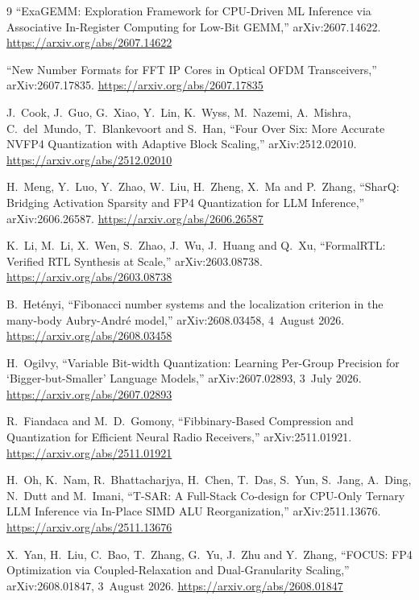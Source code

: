 \documentclass[11pt]{article}
\theoremstyle{definition}
\begin{document}
\begin{thebibliography}{9}
 ``ExaGEMM: Exploration Framework for CPU-Driven ML Inference via Associative In-Register Computing for Low-Bit GEMM,'' arXiv:2607.14622. \url{https://arxiv.org/abs/2607.14622}

 ``New Number Formats for FFT IP Cores in Optical OFDM Transceivers,'' arXiv:2607.17835. \url{https://arxiv.org/abs/2607.17835}

 J.~Cook, J.~Guo, G.~Xiao, Y.~Lin, K.~Wyss, M.~Nazemi, A.~Mishra, C.~del~Mundo, T.~Blankevoort and S.~Han, ``Four Over Six: More Accurate NVFP4 Quantization with Adaptive Block Scaling,'' arXiv:2512.02010. \url{https://arxiv.org/abs/2512.02010}

 H.~Meng, Y.~Luo, Y.~Zhao, W.~Liu, H.~Zheng, X.~Ma and P.~Zhang, ``SharQ: Bridging Activation Sparsity and FP4 Quantization for LLM Inference,'' arXiv:2606.26587. \url{https://arxiv.org/abs/2606.26587}

 K.~Li, M.~Li, X.~Wen, S.~Zhao, J.~Wu, J.~Huang and Q.~Xu, ``FormalRTL: Verified RTL Synthesis at Scale,'' arXiv:2603.08738. \url{https://arxiv.org/abs/2603.08738}

 B.~Het\'enyi, ``Fibonacci number systems and the localization criterion in the many-body Aubry-Andr\'e model,'' arXiv:2608.03458, 4~August 2026. \url{https://arxiv.org/abs/2608.03458}

 H.~Ogilvy, ``Variable Bit-width Quantization: Learning Per-Group Precision for `Bigger-but-Smaller' Language Models,'' arXiv:2607.02893, 3~July 2026. \url{https://arxiv.org/abs/2607.02893}

 R.~Fiandaca and M.~D.~Gomony, ``Fibbinary-Based Compression and Quantization for Efficient Neural Radio Receivers,'' arXiv:2511.01921. \url{https://arxiv.org/abs/2511.01921}

 H.~Oh, K.~Nam, R.~Bhattacharjya, H.~Chen, T.~Das, S.~Yun, S.~Jang, A.~Ding, N.~Dutt and M.~Imani, ``T-SAR: A Full-Stack Co-design for CPU-Only Ternary LLM Inference via In-Place SIMD ALU Reorganization,'' arXiv:2511.13676. \url{https://arxiv.org/abs/2511.13676}

 X.~Yan, H.~Liu, C.~Bao, T.~Zhang, G.~Yu, J.~Zhu and Y.~Zhang, ``FOCUS: FP4 Optimization via Coupled-Relaxation and Dual-Granularity Scaling,'' arXiv:2608.01847, 3~August 2026. \url{https://arxiv.org/abs/2608.01847}


\end{thebibliography}
\end{document}
